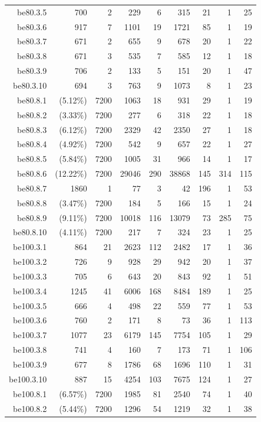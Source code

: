 \documentclass[pdflatex,sn-mathphys-num]{sn-jnl}%
\theoremstyle{thmstyleone}%
\theoremstyle{thmstyletwo}%
\theoremstyle{thmstylethree}%
\begin{document}
\begin{table}[!h]
{\begin{tabular}{rrrrrrrrr}
		be80.3.5 &700 &2 &229 &6 &315 &21 &1 &25  \\
		be80.3.6 &917 &7 &1101 &19 &1721 &85 &1 &19  \\
		be80.3.7 &671 &2 &655 &9 &678 &20 &1 &22  \\
		be80.3.8 &671 &3 &535 &7 &585 &12 &1 &18  \\
		be80.3.9 &706 &2 &133 &5 &151 &20 &1 &47  \\
		be80.3.10 &694 &3 &763 &9 &1073 &8 &1 &23  \\
		be80.8.1 &(5.12\%) &7200 &1063 &18 &931 &29 &1 &19  \\
		be80.8.2 &(3.33\%) &7200 &277 &6 &318 &22 &1 &18  \\
		be80.8.3 &(6.12\%) &7200 &2329 &42 &2350 &27 &1 &18  \\
		be80.8.4 &(4.92\%) &7200 &542 &9 &657 &22 &1 &27  \\
		be80.8.5 &(5.84\%) &7200 &1005 &31 &966 &14 &1 &17  \\
		be80.8.6 &(12.22\%) &7200 &29046 &290 &38868 &145 &314 &115  \\
		be80.8.7 &1860 &1 &77 &3 &42 &196 &1 &53  \\
		be80.8.8 &(3.47\%) &7200 &184 &5 &166 &15 &1 &24  \\
		be80.8.9 &(9.11\%) &7200 &10018 &116 &13079 &73 &285 &75  \\
		be80.8.10 &(4.11\%) &7200 &217 &7 &324 &23 &1 &25  \\
		be100.3.1 &864 &21 &2623 &112 &2482 &17 &1 &36  \\
		be100.3.2 &726 &9 &928 &29 &942 &20 &1 &37  \\
		be100.3.3 &705 &6 &643 &20 &843 &92 &1 &51  \\
		be100.3.4 &1245 &41 &6006 &168 &8484 &189 &1 &25  \\
		be100.3.5 &666 &4 &498 &22 &559 &77 &1 &53  \\
		be100.3.6 &760 &2 &171 &8 &73 &36 &1 &113  \\
		be100.3.7 &1077 &23 &6179 &145 &7754 &105 &1 &29  \\
		be100.3.8 &741 &4 &160 &7 &173 &71 &1 &106  \\
		be100.3.9 &677 &8 &1786 &68 &1696 &110 &1 &31  \\
		be100.3.10 &887 &15 &4254 &103 &7675 &124 &1 &27  \\
		be100.8.1 &(6.57\%) &7200 &1985 &81 &2540 &74 &1 &40  \\
		be100.8.2 &(5.44\%) &7200 &1296 &54 &1219 &32 &1 &38  \\

\end{tabular}}
\end{table}
\end{document}
